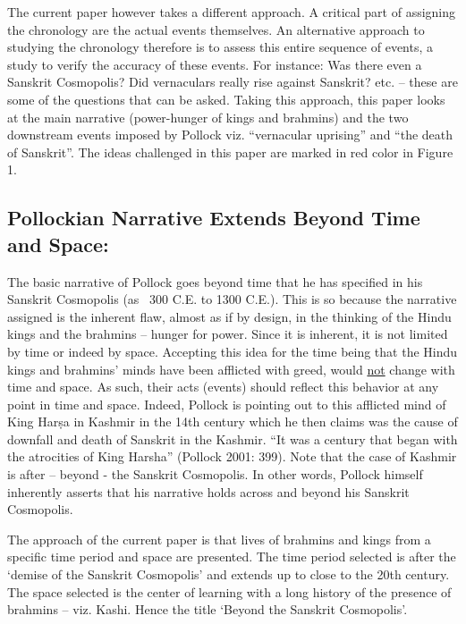 The current paper however takes a different approach. A critical part of assigning the chronology are the actual events themselves. An alternative approach to studying the chronology therefore is to assess this entire sequence of events, a study to verify the accuracy of these events. For instance: Was there even a Sanskrit Cosmopolis? Did vernaculars really rise against Sanskrit? etc. – these are some of the questions that can be asked. Taking this approach, this paper looks at the main narrative (power-hunger of kings and brahmins) and the two downstream events imposed by Pollock viz. “vernacular uprising” and “the death of Sanskrit”. The ideas challenged in this paper are marked in red color in Figure 1.


\subsection*{Pollockian Narrative Extends Beyond Time and Space:}

The basic narrative of Pollock goes beyond time that he has specified in his Sanskrit Cosmopolis (as ~300 C.E. to 1300 C.E.). This is so because the narrative assigned is the inherent flaw, almost as if by design, in the thinking of the Hindu kings and the brahmins – hunger for power. Since it is inherent, it is not limited by time or indeed by space. Accepting this idea for the time being that the Hindu kings and brahmins’ minds have been afflicted with greed, would \underline{not} change with time and space. As such, their acts (events) should reflect this behavior at any point in time and space. Indeed, Pollock is pointing out to this afflicted mind of King Harṣa in Kashmir in the 14th century which he then claims was the cause of downfall and death of Sanskrit in the Kashmir. “It was a century that began with the atrocities of King Harsha” (Pollock 2001: 399). Note that the case of Kashmir is after – beyond - the Sanskrit Cosmopolis. In other words, Pollock himself inherently asserts that his narrative holds across and beyond his Sanskrit Cosmopolis.

The approach of the current paper is that lives of brahmins and kings from a specific time period and space are presented. The time period selected is after the ‘demise of the Sanskrit Cosmopolis’ and extends up to close to the 20th century. The space selected is the center of learning with a long history of the presence of brahmins – viz. Kashi. Hence the title ‘Beyond the Sanskrit Cosmopolis’.

